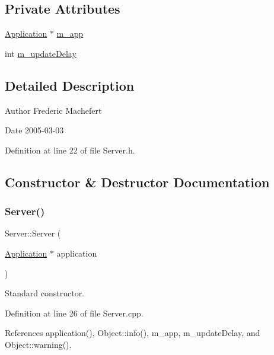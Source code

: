 \subsection*{Private Attributes}
\begin{DoxyCompactItemize}
\item 
\hyperlink{classApplication}{Application} $\ast$ \hyperlink{classServer_ae1c25dc357c4a1145289c747fddaa251}{m\+\_\+app}
\item 
int \hyperlink{classServer_ae991d55181bff0552a34278ea9f76735}{m\+\_\+update\+Delay}
\end{DoxyCompactItemize}


\subsection{Detailed Description}
\begin{DoxyAuthor}{Author}
Frederic Machefert 
\end{DoxyAuthor}
\begin{DoxyDate}{Date}
2005-\/03-\/03 
\end{DoxyDate}


Definition at line 22 of file Server.\+h.



\subsection{Constructor \& Destructor Documentation}
\mbox{\label{classServer_ac808c867e64a7f139b1958abeb387a15}} 
\subsubsection{\texorpdfstring{Server()}{Server()}}
{\footnotesize\ttfamily Server\+::\+Server (\begin{DoxyParamCaption}\item[{\hyperlink{classApplication}{Application} $\ast$}]{application }\end{DoxyParamCaption})}



Standard constructor. 



Definition at line 26 of file Server.\+cpp.



References application(), Object\+::info(), m\+\_\+app, m\+\_\+update\+Delay, and Object\+::warning().


